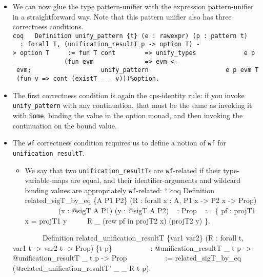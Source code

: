 \begin{itemize}
  \begin{itemize}
  \tightlist
  \item
    We can now glue the type pattern-unifier with the expression
    pattern-unifier in a straightforward way. Note that this pattern
    unifier also has three correctness conditions.
    \texttt{coq\ \ \ Definition\ unify\_pattern\ \{t\}\ (e\ :\ rawexpr)\ (p\ :\ pattern\ t)\ \ \ ~\ :\ forall\ T,\ (unification\_resultT\ p\ -\textgreater{}\ option\ T)\ -\textgreater{}\ option\ T\ \ \ ~\ :=\ fun\ T\ cont\ \ \ ~\ ~\ ~=\textgreater{}\ unify\_types\ \ \ ~\ ~\ ~\ ~\ ~\ e\ p\ \_\ \ \ ~\ ~\ ~\ ~\ ~\ (fun\ evm\ \ \ ~\ ~\ ~\ ~\ ~\ ~=\textgreater{}\ evm\ \textless{}-\ evm;\ \ \ ~\ ~\ ~\ ~\ ~\ ~\ ~\ ~\ unify\_pattern\textquotesingle{}\ \ \ ~\ ~\ ~\ ~\ ~\ ~\ ~\ ~\ ~\ e\ p\ evm\ T\ (fun\ v\ =\textgreater{}\ cont\ (existT\ \_\ \_\ v)))\%option.}
  \item
    The first correctness condition is again the cps-identity rule: if
    you invoke \texttt{unify\_pattern} with any continuation, that must
    be the same as invoking it with \texttt{Some}, binding the value in
    the option monad, and then invoking the continuation on the bound
    value.
  \item
    The \texttt{wf} correctness condition requires us to define a notion
    of \texttt{wf} for \texttt{unification\_resultT}.

    \begin{itemize}
    \tightlist
    \item
      We say that two \texttt{unification\_resultT}s are
      \texttt{wf}-related if their type-variable-maps are equal, and
      their identifier-arguments and wildcard binding values are
      appropriately \texttt{wf}-related: ```coq Definition
      related\_sigT\_by\_eq \{A P1 P2\} (R : forall x : A, P1 x
      -\textgreater{} P2 x -\textgreater{} Prop) ~ ~ ~ ~ ~ ~(x : @sigT A
      P1) (y : @sigT A P2) ~ : Prop ~ := \{ pf : projT1 x = projT1 y ~ ~
      ~\textbar{} R \_ (rew pf in projT2 x) (projT2 y) \}.
    \end{itemize}

    ~ ~ ~ ~ ~ Definition related\_unification\_resultT \{var1 var2\} (R
    : forall t, var1 t -\textgreater{} var2 t -\textgreater{} Prop) \{t
    p\} ~ ~ ~ ~ ~ ~ : @unification\_resultT \_ t p -\textgreater{}
    @unification\_resultT \_ t p -\textgreater{} Prop ~ ~ ~ ~ ~ ~ :=
    related\_sigT\_by\_eq (@related\_unification\_resultT' \_ \_ R t p).


\end{itemize}
\end{itemize}
